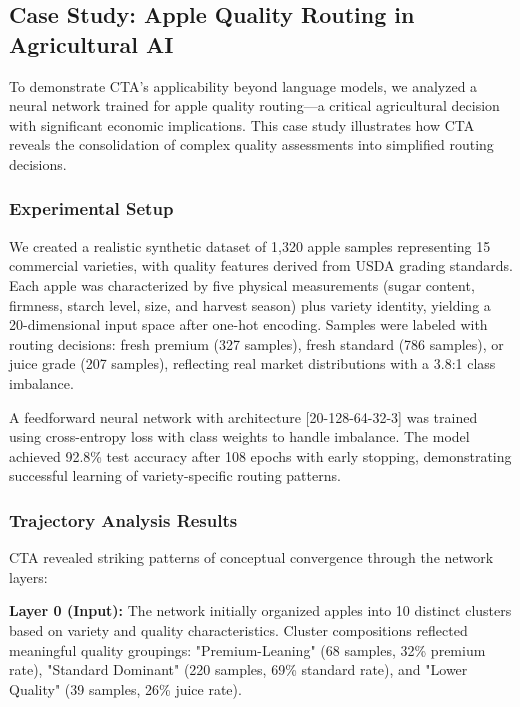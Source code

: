 
\subsection{Case Study: Apple Quality Routing in Agricultural AI}

To demonstrate CTA's applicability beyond language models, we analyzed a neural network trained for apple quality routing—a critical agricultural decision with significant economic implications. This case study illustrates how CTA reveals the consolidation of complex quality assessments into simplified routing decisions.

\subsubsection{Experimental Setup}

We created a realistic synthetic dataset of 1,320 apple samples representing 15 commercial varieties, with quality features derived from USDA grading standards. Each apple was characterized by five physical measurements (sugar content, firmness, starch level, size, and harvest season) plus variety identity, yielding a 20-dimensional input space after one-hot encoding. Samples were labeled with routing decisions: fresh premium (327 samples), fresh standard (786 samples), or juice grade (207 samples), reflecting real market distributions with a 3.8:1 class imbalance.

A feedforward neural network with architecture [20-128-64-32-3] was trained using cross-entropy loss with class weights to handle imbalance. The model achieved 92.8\% test accuracy after 108 epochs with early stopping, demonstrating successful learning of variety-specific routing patterns.

\subsubsection{Trajectory Analysis Results}

CTA revealed striking patterns of conceptual convergence through the network layers:

\textbf{Layer 0 (Input):} The network initially organized apples into 10 distinct clusters based on variety and quality characteristics. Cluster compositions reflected meaningful quality groupings: "Premium-Leaning" (68 samples, 32\% premium rate), "Standard Dominant" (220 samples, 69\% standard rate), and "Lower Quality" (39 samples, 26\% juice rate).

